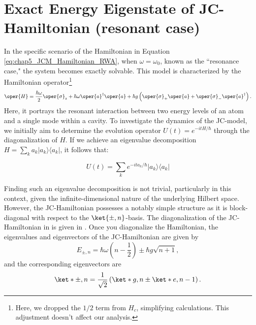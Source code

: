 \section[Exact Energy Eigenstate of JC-Hamiltonian]{Exact Energy Eigenstate of JC-Hamiltonian (resonant case)}

In the specific scenario of the Hamiltonian in Equation \ref{eq:chap5_JCM_Hamiltonian_RWA}, when 
\(\omega  = \omega_0\), known as the 
``resonance case," the system becomes exactly solvable.
This model is characterized by the Hamiltonian operator\footnote{Here, we dropped the \(1/2\) term from \(H_c\), 
simplifying calculations. This adjustment doesn't affect our analysis.}
\begin{equation}
        \label{eq:chap5_JCM_Hamiltonian_resonance}
        \oper{H} = \frac{\hbar\omega}{2} \oper{\sigma}_z + \hbar \omega \oper{a}^\dagger \oper{a}
        + \hbar g \left(\oper{\sigma}_+ \oper{a} + \oper{\sigma}_- \oper{a}^\dagger\right). 
\end{equation}
Here, it portrays the resonant interaction between two energy levels of an atom and a single mode within a cavity.
To investigate the dynamics of the JC-model, we initially aim to determine the evolution operator 
$U(t) = e^{-i t H/\hbar}$ through the diagonalization of $H$. If we achieve an eigenvalue decomposition 
$H = \sum_k a_k \lvert a_k \rangle \langle a_k \rvert$, it follows that:

\begin{equation}
U(t) = \sum_k e^{-i t a_k/\hbar} \lvert a_k \rangle \langle a_k \rvert
\end{equation}

Finding such an eigenvalue decomposition is not trivial, particularly in this context, 
given the infinite-dimensional nature of the underlying Hilbert space. However, the 
JC-Hamiltonian possesses a notably simple structure as it is block-diagonal with respect 
to the $\ket{\pm, n}$-basis. The diagonalization of the JC-Hamiltonian in 
 is given in  .
Once you diagonalize the Hamiltonian, the eigenvalues and eigenvectors of the JC-Hamiltonian are given by
\begin{equation}
        \label{eq:chap5_JCM_eigenvalues}
        E_{\pm, n} = \hbar \omega \left(n - \frac{1}{2}\right) \pm \hbar g \sqrt{n + 1},
\end{equation}
and the corresponding eigenvectors are
\begin{equation}
        \label{eq:chap5_JCM_eigenvectors}
        \ket*{\pm, n} = \frac{1}{\sqrt{2}} \left(\ket*{g, n} \pm \ket*{e, n-1}\right).
\end{equation}
